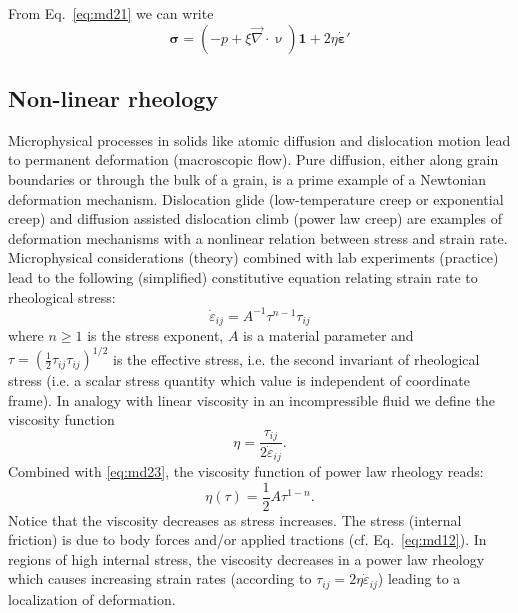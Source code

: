From Eq.~\eqref{eq:md21} we can write
\[
{\bm\sigma} = (-p + \xi \vec\nabla\cdot\upnu){\bm 1} + 2 \eta \dot{\bm \varepsilon}'
\]

\vspace{0.5cm}
\vspace{0.5cm}






\subsection{Non-linear rheology} 
Microphysical processes in solids like atomic diffusion and
dislocation motion lead to permanent deformation (macroscopic flow). Pure diffusion,
either along grain boundaries or through the bulk of a grain, is a prime example of a
Newtonian deformation mechanism. Dislocation glide (low-temperature creep or
exponential creep) and diffusion assisted dislocation climb (power law creep) are
examples of deformation mechanisms with a nonlinear relation between stress and strain
rate. Microphysical considerations (theory) combined with lab experiments (practice)
lead to the following (simplified) constitutive equation relating strain rate to rheological
stress:
\begin{equation}
\dot\varepsilon_{ij} = A^{-1} \tau^{n-1} \tau_{ij}
\label{eq:md23}
\end{equation}
where $n\ge 1$ is the stress exponent, $A$ is a material parameter
and $\tau=(\frac12 \tau_{ij}\tau_{ij})^{1/2}$ is the effective stress, i.e. the 
second invariant of rheological stress
(i.e. a scalar stress quantity which value is independent of coordinate frame). In analogy
with linear viscosity in an incompressible fluid we define the viscosity function
\begin{equation}
\eta=\frac{\tau_{ij}}{2 \dot\varepsilon_{ij}}.
\label{eq:md24}
\end{equation}
Combined with \eqref{eq:md23}, 
the viscosity function of power law rheology reads:
\begin{equation}
\eta(\tau) = \frac12 A \tau^{1-n}.
\label{eq:md25}
\end{equation}
Notice that the viscosity decreases as stress increases. The stress
(internal friction) is due to body forces and/or applied tractions (cf. Eq.~\eqref{eq:md12}). In regions of
high internal stress, the viscosity decreases in a power law rheology which causes
increasing strain rates (according to $\tau_{ij}=2\eta \dot\varepsilon_{ij}$) 
leading to a localization of deformation.


